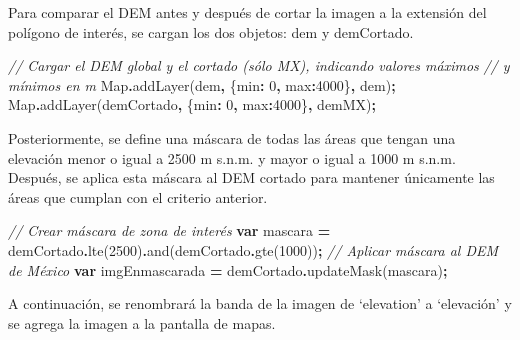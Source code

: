 \documentclass[
  12pt,
  letterpaper,
  twoside]{book}
\newenvironment{Shaded}{\begin{snugshade}}{\end{snugshade}}
\newcommand{\BuiltInTok}[1]{#1}
\newcommand{\CommentTok}[1]{\textcolor[rgb]{0.56,0.35,0.01}{\textit{#1}}}
\newcommand{\DataTypeTok}[1]{\textcolor[rgb]{0.13,0.29,0.53}{#1}}
\newcommand{\DecValTok}[1]{\textcolor[rgb]{0.00,0.00,0.81}{#1}}
\newcommand{\FunctionTok}[1]{\textcolor[rgb]{0.00,0.00,0.00}{#1}}
\newcommand{\KeywordTok}[1]{\textcolor[rgb]{0.13,0.29,0.53}{\textbf{#1}}}
\newcommand{\NormalTok}[1]{#1}
\newcommand{\OperatorTok}[1]{\textcolor[rgb]{0.81,0.36,0.00}{\textbf{#1}}}
\newcommand{\StringTok}[1]{\textcolor[rgb]{0.31,0.60,0.02}{#1}}
\begin{document}
Para comparar el DEM antes y después de cortar la imagen a la extensión del polígono de interés, se cargan los dos objetos: dem y demCortado.

\begin{Shaded}
\begin{Highlighting}[]
\CommentTok{// Cargar el DEM global y el cortado (sólo MX), indicando valores máximos }
\CommentTok{// y mínimos en m}
\BuiltInTok{Map}\OperatorTok{.}\FunctionTok{addLayer}\NormalTok{(dem}\OperatorTok{,}\NormalTok{ \{}\DataTypeTok{min}\OperatorTok{:} \DecValTok{0}\OperatorTok{,} \DataTypeTok{max}\OperatorTok{:}\DecValTok{4000}\NormalTok{\}}\OperatorTok{,} \StringTok{\textquotesingle{}dem\textquotesingle{}}\NormalTok{)}\OperatorTok{;}
\BuiltInTok{Map}\OperatorTok{.}\FunctionTok{addLayer}\NormalTok{(demCortado}\OperatorTok{,}\NormalTok{ \{}\DataTypeTok{min}\OperatorTok{:} \DecValTok{0}\OperatorTok{,} \DataTypeTok{max}\OperatorTok{:}\DecValTok{4000}\NormalTok{\}}\OperatorTok{,} \StringTok{\textquotesingle{}demMX\textquotesingle{}}\NormalTok{)}\OperatorTok{;}
\end{Highlighting}
\end{Shaded}

Posteriormente, se define una máscara de todas las áreas que tengan una elevación menor o igual a 2500 m s.n.m. y mayor o igual a 1000 m s.n.m. Después, se aplica esta máscara al DEM cortado para mantener únicamente las áreas que cumplan con el criterio anterior.

\begin{Shaded}
\begin{Highlighting}[]
\CommentTok{// Crear máscara de zona de interés}
\KeywordTok{var}\NormalTok{ mascara }\OperatorTok{=}\NormalTok{ demCortado}\OperatorTok{.}\FunctionTok{lte}\NormalTok{(}\DecValTok{2500}\NormalTok{)}\OperatorTok{.}\FunctionTok{and}\NormalTok{(demCortado}\OperatorTok{.}\FunctionTok{gte}\NormalTok{(}\DecValTok{1000}\NormalTok{))}\OperatorTok{;}
\CommentTok{// Aplicar máscara al DEM de México}
\KeywordTok{var}\NormalTok{ imgEnmascarada }\OperatorTok{=}\NormalTok{ demCortado}\OperatorTok{.}\FunctionTok{updateMask}\NormalTok{(mascara)}\OperatorTok{;}
\end{Highlighting}
\end{Shaded}

A continuación, se renombrará la banda de la imagen de `elevation' a `elevación' y se agrega la imagen a la pantalla de mapas.
\end{document}
